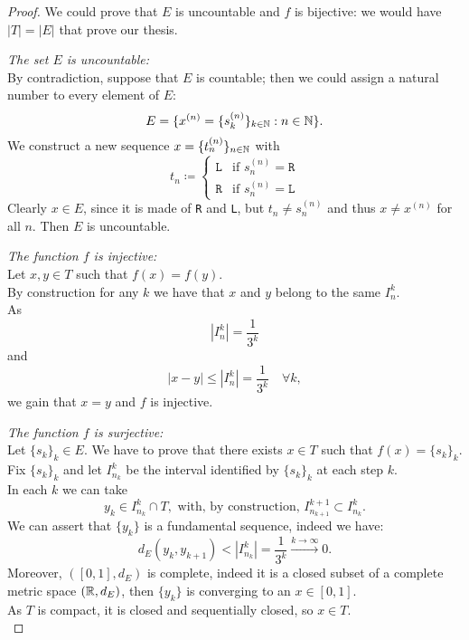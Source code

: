 \begin{proof}
	We could prove that $E$ is uncountable and $f$ is bijective: we would have $|T| = |E|$ that prove our thesis.
	
	\textit{The set $E$ is uncountable:}\\ By contradiction, suppose that $E$ is countable; then we could assign a natural number to every element of $E$:
	$$E = \{ x^{(n)} = \{s_k^{(n)}\}_{k \in \mathbb N} : n \in \mathbb N\}.$$
	We construct a new sequence $x = \{t_n^{(n)}\}_{n \in \mathbb N}$  with 
	\[t_n \coloneqq
	\begin{cases}
	\texttt{L} & \text{if } s_n^{(n)} = \texttt{R} \\
	\texttt{R} & \text{if } s_n^{(n)} = \texttt{L}
	\end{cases}\]
	Clearly $x \in E$, since it is made of \texttt{R} and \texttt{L}, but $t_n \neq s_n^{(n)}$ and thus $x \neq x^{(n)}$ for all $n$. Then $E$ is uncountable.
	
	\textit{The function $f$ is injective:}\\	Let $x,y \in T$ such that $f(x) = f(y)$.\\
	By construction for any $k$ we have that $x$ and $y$ belong to the same $I_n^k$.\\
	As 
	$$
	|I_n^k| 
	= \frac 1{3^k}
	$$ 
	and 
	$$
	|x-y| 
	\leq |I_n^k| 
	= \frac 1 {3^k} 
	\quad \forall k
	,
	$$
	we gain that $x=y$ and $f$ is injective.
	
	\textit{The function $f$ is surjective:}\\
	Let $\{s_k\}_k \in E$. We have to prove that there exists $x \in T$ such that $f(x) = \{s_k\}_k$.\\
	Fix $\{s_k\}_k$ and let $I_{n_k}^k$ be the interval identified by $\{s_k\}_k$ at each step $k$.\\
	In each $k$ we can take 
	$$
	y_k 
	\in I_{n_k}^k \cap T
	, \text{ with, by construction, }
	I_{n_{k+1}}^{k+1} 
	\subset I_{n_k}^k
	.
	$$
	We can assert that $\{y_k\}$ is a fundamental sequence, indeed we have:
	$$
	d_E(y_k, y_{k+1}) 
	< |I_{n_k}^k| 
	= \frac 1 {3^k} 
	\xrightarrow{k \to \infty}
	0
	.
	$$
	Moreover, $([0,1], d_E)$ is complete, indeed it is a closed subset of a complete metric space $(\mathbb R, d_E)$, then $\{y_k\}$ is converging to an $x \in [0,1]$.\\
	As $T$ is compact, it is closed and sequentially closed, so $x \in T$.\\
	

\end{proof}
